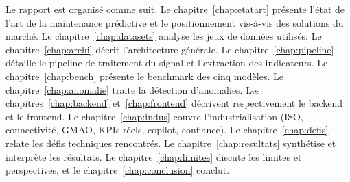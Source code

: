 Le rapport est organisé comme suit. Le chapitre~\ref{chap:etatart} présente l'état de l'art
de la maintenance prédictive et le positionnement vis-à-vis des solutions du marché. Le
chapitre~\ref{chap:datasets} analyse les jeux de données utilisés. Le
chapitre~\ref{chap:archi} décrit l'architecture générale. Le chapitre~\ref{chap:pipeline}
détaille le pipeline de traitement du signal et l'extraction des indicateurs. Le
chapitre~\ref{chap:bench} présente le benchmark des cinq modèles. Le
chapitre~\ref{chap:anomalie} traite la détection d'anomalies. Les
chapitres~\ref{chap:backend} et~\ref{chap:frontend} décrivent respectivement le backend et
le frontend. Le chapitre~\ref{chap:indus} couvre l'industrialisation (ISO, connectivité,
GMAO, KPIs réels, copilot, confiance). Le chapitre~\ref{chap:defis} relate les défis
techniques rencontrés. Le chapitre~\ref{chap:resultats} synthétise et interprète les
résultats. Le chapitre~\ref{chap:limites} discute les limites et perspectives, et le
chapitre~\ref{chap:conclusion} conclut.
